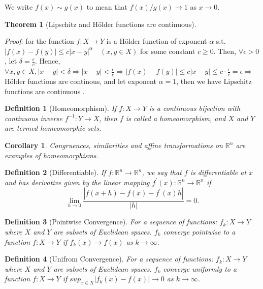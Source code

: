 \documentclass[12pt, a4paper]{article}
\newtheorem{definition}{Definition}[subsection]
\newtheorem{theorem}{Theorem}[subsection]
\newtheorem{corollary}{Corollary}[subsection]
\begin{document}
We write $f(x) \sim g(x)$ to mean that $f(x) / g(x) \rightarrow 1$ as $x \rightarrow 0$.

\begin{theorem}[Lipschitz and Hölder functions are continuous]
\end{theorem}

\textit{Proof}: for the function $f: X \rightarrow Y$ is a Hölder 
function of exponent $\alpha$ s.t. 
$|f(x)-f(y)| \leq c|x-y|^{\alpha} \quad (x, y \in X)$ for some constant $c\geq 0$.
Then, $\forall \epsilon > 0$, let $\displaystyle \delta = \frac{\epsilon}{c}$. Hence, 
$\forall x, y\in X, |x-y| < \delta \Rightarrow \displaystyle |x-y| < \frac{\epsilon}{c} \Rightarrow |f(x) - f(y)| \leq c |x-y| \leq c\cdot \frac{\epsilon}{c} = \epsilon \Rightarrow$ Hölder functions are continous, 
and let exponent $\alpha = 1$, then we have Lipschitz functions are continuous .

\begin{definition}[Homeomorphism]
    If $f: X \rightarrow Y$ is a continuous bijection with continuous 
    inverse $f^{-1}: Y \rightarrow X$, then $f$ is called a homeomorphism, 
    and $X$ and $Y$ are termed homeomorphic sets. 
\end{definition}
\begin{corollary}
    Congruences, similarities 
    and affine transformations on $\mathbb{R}^{n}$ are examples of homeomorphisms.
\end{corollary}

\begin{definition}[Differentiable]
    If $f: \mathbb{R}^{n} \rightarrow \mathbb{R}^{n}$, we say that $f$ is 
    differentiable at $x$ and has derivative given by the linear mapping 
    $f^{\prime}(x): \mathbb{R}^{n} \rightarrow \mathbb{R}^{n}$ if
$$
\lim _{h \rightarrow 0} \frac{\left|f(x+h)-f(x)-f^{\prime}(x) h\right|}{|h|}=0 .
$$
\end{definition}

\begin{definition}[Pointwise Convergence]
    For a sequence of functions: $f_k : X\rightarrow Y$ where $X$ and $Y$ are subsets 
    of Euclidean spaces. $f_k$ converge pointwise to a function $f:X\rightarrow Y$ if 
    $f_k(x)\rightarrow f(x)$ as $k\rightarrow \infty$.
\end{definition}

\begin{definition}[Unifrom Convergence]
    For a sequence of functions: $f_k : X\rightarrow Y$ where $X$ and $Y$ are subsets 
    of Euclidean spaces. $f_k$ converge uniformly to a function $f:X\rightarrow Y$ if 
    $sup_{x\in X} |f_k(x)- f(x)| \rightarrow 0$ as $k\rightarrow \infty$.
\end{definition}
\end{document}
